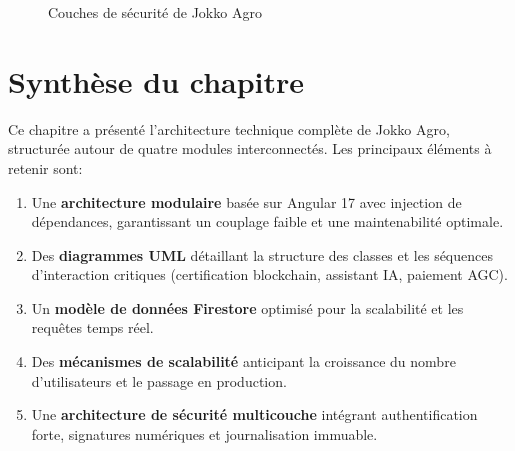 \documentclass[12pt,a4paper]{report}
\begin{document}
\begin{figure}[H]
  \centering
  \caption{Couches de sécurité de Jokko Agro}
  \label{fig:security}
\end{figure}

\vspace{0.5cm}

\section{Synthèse du chapitre}

\noindent
Ce chapitre a présenté l'architecture technique complète de Jokko Agro, structurée
autour de quatre modules interconnectés. Les principaux éléments à retenir sont:

\begin{enumerate}
  \item Une \textbf{architecture modulaire} basée sur Angular 17 avec injection de
        dépendances, garantissant un couplage faible et une maintenabilité optimale.
  \item Des \textbf{diagrammes UML} détaillant la structure des classes et les
        séquences d'interaction critiques (certification blockchain, assistant IA,
        paiement AGC).
  \item Un \textbf{modèle de données Firestore} optimisé pour la scalabilité et les
        requêtes temps réel.
  \item Des \textbf{mécanismes de scalabilité} anticipant la croissance du nombre
        d'utilisateurs et le passage en production.
  \item Une \textbf{architecture de sécurité multicouche} intégrant authentification
        forte, signatures numériques et journalisation immuable.
\end{enumerate}
\end{document}
